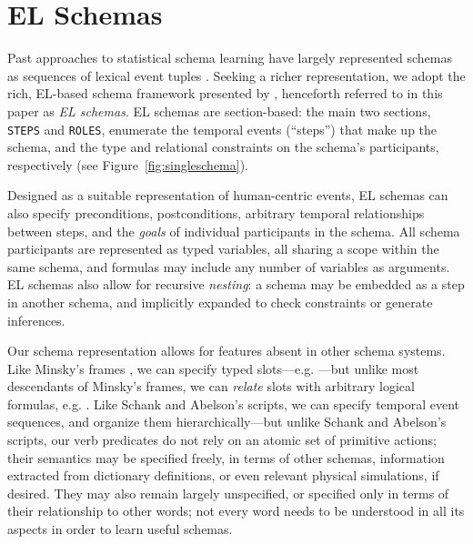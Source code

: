 \chapter{EL Schemas}

Past approaches to statistical schema learning have largely represented schemas as sequences of lexical event tuples \citep{chambers2008unsupervised,pichotta2016learning}. Seeking a richer representation, we adopt the rich, EL-based schema framework presented by \citet{Lawley2021LearningGE}, henceforth referred to in this paper as \textit{EL schemas}. EL schemas are section-based: the main two sections, \texttt{STEPS} and \texttt{ROLES}, enumerate the temporal events (``steps'') that make up the schema, and the type and relational constraints on the schema's participants, respectively (see Figure~\ref{fig:singleschema}).

Designed as a suitable representation of human-centric events, EL schemas can also specify preconditions, postconditions, arbitrary temporal relationships between steps, and the \textit{goals} of individual participants in the schema. All schema participants are represented as typed variables, all sharing a scope within the same schema, and formulas may include any number of variables as arguments. EL schemas also allow for recursive \textit{nesting}: a schema may be embedded as a step in another schema, and implicitly expanded to check constraints or generate inferences.

Our schema representation allows for features absent in other schema systems. Like Minsky's frames \citep{minsky1974MIT}, we can specify typed slots---e.g. ---but unlike most descendants of Minsky's frames, we can \textit{relate} slots with arbitrary logical formulas, e.g. . Like Schank and Abelson's scripts, we can specify temporal event sequences, and organize them hierarchically---but unlike Schank and Abelson's scripts, our verb predicates do not rely on an atomic set of primitive actions; their semantics may be specified freely, in terms of other schemas, information extracted from dictionary definitions, or even relevant physical simulations, if desired. They may also remain largely unspecified, or specified only in terms of their relationship to other words; not every word needs to be understood in all its aspects in order to learn useful schemas.


